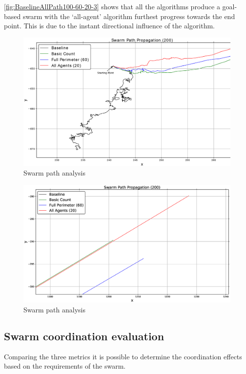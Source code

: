 \autoref{fig:BaselineAllPath100-60-20-3} shows that all the algorithms produce a goal-based swarm with the `all-agent' algorithm furthest progress towards the end point. This is due to the instant directional influence of the algorithm. 

\begin{figure}[H]
\begin{center}
\includegraphics[width=14cm]{CHAPTER-6/figures/BaselineAllPath100-60-20-2}
\end{center}
\caption{Swarm path analysis\label{fig:BaselineAllPath100-60-20-2}}
\end{figure}

\begin{figure}[H]
\begin{center}
\includegraphics[width=14cm]{CHAPTER-6/figures/BaselineAllPath100-60-20-3}
\end{center}
\caption{Swarm path analysis\label{fig:BaselineAllPath100-60-20-3}}
\end{figure}

\subsection{Swarm coordination evaluation\label{reduced:coordinationEvaluation}}
Comparing the three metrics it is possible to determine the coordination effects based on the requirements of the swarm.

